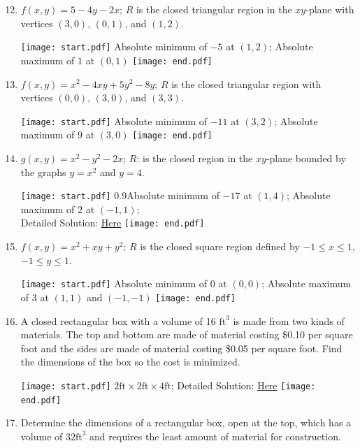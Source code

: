 \documentclass[12pt]{article}
\begin{document}
\begin{enumerate}
\setcounter{enumi}{11}

\item $f(x,y)=5-4y-2x$; $R$ is the closed triangular region in the $xy$-plane with vertices $(3,0)$, $(0,1)$, and $(1,2)$. 

\texttt{[image: start.pdf]}
{{Absolute minimum of $-5$ at $(1,2)$; Absolute maximum of $1$ at $(0,1)$}}
\texttt{[image: end.pdf]}


\item $f(x,y)=x^2-4xy+5y^2-8y$; $R$ is the closed triangular region with vertices $(0,0)$, $(3,0)$, and $(3,3)$.

\texttt{[image: start.pdf]}
{{Absolute minimum of $-11$ at $(3,2)$; Absolute maximum of 9 at $(3,0)$}}
\texttt{[image: end.pdf]}


\item $g(x,y)=x^2-y^2-2x$; $R$: is the closed region in the $xy$-plane bounded by the graphs $y=x^2$ and $y=4$. 

\texttt{[image: start.pdf]}
{{{0.9\linewidth}{Absolute minimum of $-17$ at $(1,4)$; Absolute maximum of $2$ at $(-1,1)$; 
\\Detailed Solution: \textcolor{blue}{\href{http://www.math.drexel.edu/classes/Calculus/resources/Math200HW/Solutions/15_200_Extrema_14.pdf}{Here}}}} }
\texttt{[image: end.pdf]}


\item $f(x,y)=x^2+xy+y^2$; $R$ is the closed square region defined by $-1 \leq x \leq 1$, $-1 \leq y \leq 1$.

\texttt{[image: start.pdf]}
{{Absolute minimum of 0 at $(0,0)$; Absolute maximum of 3 at $(1,1)$ and $(-1,-1)$}}
\texttt{[image: end.pdf]}


\item A closed rectangular box with a volume of 16 $\text{ft}^3$ is made from two kinds of materials.  The top and bottom are made of material costing \$0.10 per square foot and the sides are made of material costing \$0.05 per square foot.  Find the dimensions of the box so the cost is minimized.

\texttt{[image: start.pdf]}
{{$2\text{ft} \times 2\text{ft} \times 4\text{ft}$; Detailed Solution: \textcolor{blue}{\href{http://www.math.drexel.edu/classes/Calculus/resources/Math200HW/Solutions/15_200_Extrema_16.pdf}{Here}}}}
\texttt{[image: end.pdf]}


\item Determine the dimensions of a rectangular box, open at the top, which has  a volume of $32 \text{ft}^3$ and requires the least amount of material for construction.


\end{enumerate}
\end{document}
